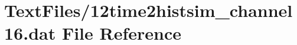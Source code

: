 \hypertarget{12time2histsim__channel16_8dat}{}\section{Text\+Files/12time2histsim\+\_\+channel16.dat File Reference}
\label{12time2histsim__channel16_8dat}
